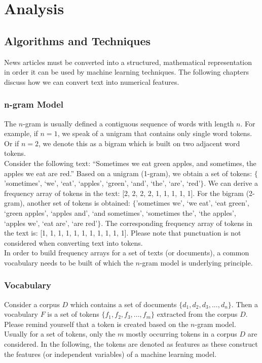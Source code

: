 \documentclass[a4paper,12pt,nottoc]{article}
\begin{document}
\section{Analysis}

\subsection{Algorithms and Techniques}

News articles must be converted into a structured, mathematical representation in order it can be used by machine learning techniques. The following chapters discuss how we can convert text into numerical features.

\subsubsection{n-gram Model}

The $n$-gram is usually defined a contiguous sequence of words with length $n$. For example, if $n = 1$, we speak of a unigram that contains only single word tokens. Or if $n = 2$, we denote this as a bigram which is built on two adjacent word tokens.\\

\noindent Consider the following text: ``Sometimes we eat green apples, and sometimes, the apples we eat are red.'' Based on a unigram (1-gram), we obtain a set of tokens: $\{$'sometimes', `we', `eat', `apples', `green', `and', `the', `are', `red'$\}$. We can derive a frequency array of tokens in the text: [2, 2, 2, 2, 1, 1, 1, 1, 1]. For the bigram (2-gram), another set of tokens is obtained: $\{$'sometimes we', `we eat', `eat green', `green apples', `apples and', `and sometimes', `sometimes the', `the apples', `apples we', `eat are', `are red'$\}$. The corresponding frequency array of tokens in the text is: [1, 1, 1, 1, 1, 1, 1, 1, 1, 1, 1]. Please note that punctuation is not considered when converting text into tokens.\\

\noindent In order to build frequency arrays for a set of texts (or documents), a common vocabulary needs to be built of which the $n$-gram model is underlying principle.

\subsubsection{Vocabulary}

Consider a corpus $D$ which contains a set of documents $\{d_1, d_2, d_3, ..., d_n\}$. Then a vocabulary $F$ is a set of tokens $\{f_1, f_2, f_3, ..., f_m\}$ extracted from the corpus $D$. Please remind yourself that a token is created based on the $n$-gram model. Usually for a set of tokens, only the $m$ mostly occurring tokens in a corpus $D$ are considered. In the following, the tokens are denoted as features as these construct the features (or independent variables) of a machine learning model.\\
\end{document}
